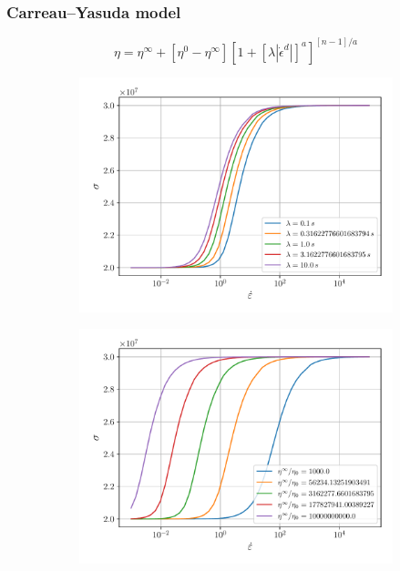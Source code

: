 \documentclass[12pt]{article}
\begin{document}
\subsubsection{Carreau--Yasuda model}

\begin{equation}
	\eta = \eta^{\infty} + \left[\eta^{0}-\eta^{\infty}\right]\left[1 + \left[\lambda \left|\dot{\epsilon}^{d}\right|\right]^{a}\right]^{\left[n-1\right]/a}
\end{equation}


\begin{figure}[!htb]
	\centering
	\begin{subfigure}{0.48\textwidth}
		\centering
		\includegraphics[width=\linewidth]{carreau-lams}
		\caption{ }
	\end{subfigure}
	\begin{subfigure}{0.48\textwidth}
		\centering
		\includegraphics[width=\linewidth]{carreau-etas}
		\caption{ }
	\end{subfigure}
	

\end{figure}
\end{document}
